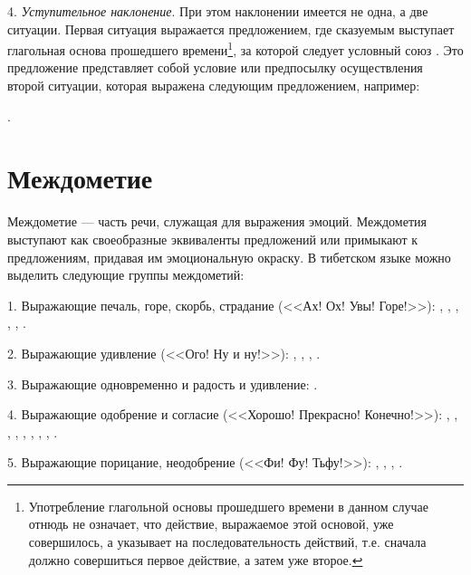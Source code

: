 4. \emph{Уступительное наклонение}. При этом наклонении имеется не одна, а две ситуации. Первая ситуация выражается предложением, где сказуемым выступает глагольная основа прошедшего времени\footnote[39]{Употребление глагольной основы прошедшего времени в данном случае отнюдь не означает, что действие, выражаемое этой основой, уже совершилось, а указывает на последовательность действий, т.е. сначала должно совершиться первое действие, а затем уже второе.}, за которой следует условный союз . Это предложение представляет собой условие или предпосылку осуществления второй ситуации, которая выражена следующим предложением, например:
\begin{prfsample}
	\item {}.
\end{prfsample}

\section{Междометие}

Междометие --- часть речи, служащая для выражения эмоций. Междометия выступают как своеобразные эквиваленты предложений или примыкают к предложениям, придавая им эмоциональную окраску. В тибетском языке можно выделить следующие группы междометий:

1. Выражающие печаль, горе, скорбь, страдание (<<Ах! Ох! Увы! Горе!>>):
,
,
,
,
,
.

2. Выражающие удивление (<<Ого! Ну и ну!>>):
,
,
,
.

3. Выражающие одновременно и радость и удивление: .

4. Выражающие одобрение и согласие (<<Хорошо! Прекрасно! Конечно!>>):
,
,
,
,
,
,
,
,
.

5. Выражающие порицание, неодобрение (<<Фи! Фу! Тьфу!>>):
,
,
,
.

